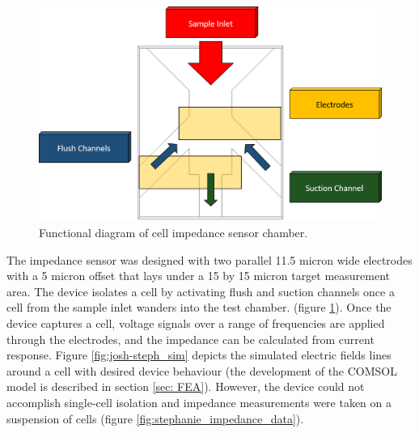 \begin{figure}[h]
    \centering
    \includegraphics[width=\textwidth]{images/josh_steph_design.png}
    \caption{Functional diagram of cell impedance sensor chamber.}
    \label{fig:josh-steph_functional_diagram}
\end{figure}

\par The impedance sensor was designed with two parallel 11.5 micron wide electrodes with a 5 micron offset that lays under a 15 by 15 micron target measurement area. The device isolates a cell by activating flush and suction channels once a cell from the sample inlet wanders into the test chamber. (figure \ref{fig:josh-steph_functional_diagram}). Once the device captures a cell, voltage signals over a range of frequencies are applied through the electrodes, and the impedance can be calculated from current response.  Figure \ref{fig:josh-steph_sim} depicts the simulated electric fields lines around a cell with desired device behaviour (the development of the COMSOL model is described in section \ref{sec: FEA}). However, the device could not accomplish single-cell isolation and impedance measurements were taken on a suspension of cells (figure \ref{fig:stephanie_impedance_data}).


